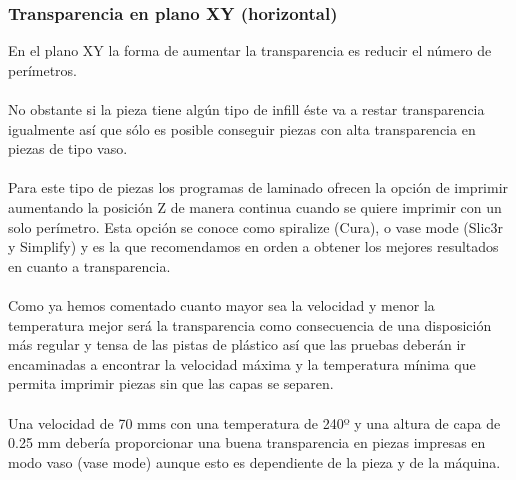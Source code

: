 \documentclass[11pt,a4paper]{article}
\begin{document}
		\subsubsection{Transparencia en plano XY (horizontal)}En el plano XY la forma de aumentar la transparencia es reducir el número de perímetros.
\\\\
No obstante si la pieza tiene algún tipo de infill éste va a restar transparencia igualmente así que sólo es posible conseguir piezas con alta transparencia en piezas de tipo vaso.
\\\\
Para este tipo de piezas los programas de laminado ofrecen la opción de imprimir aumentando la posición Z de manera continua cuando se quiere imprimir con un solo perímetro. Esta opción se conoce como spiralize (Cura), o vase mode (Slic3r y Simplify) y es la que recomendamos en orden a obtener los mejores resultados en cuanto a transparencia.
\\\\
Como ya hemos comentado cuanto mayor sea la velocidad y menor la temperatura mejor será la transparencia como consecuencia de una disposición más regular y tensa de las pistas de plástico así que las pruebas deberán ir encaminadas a encontrar la velocidad máxima y la temperatura mínima que permita imprimir piezas sin que las capas se separen.
\\\\
Una velocidad de 70 mm\/s con una temperatura de 240º y una altura de capa de 0.25 mm debería proporcionar una buena transparencia en piezas impresas en modo vaso (vase mode) aunque esto es dependiente de la pieza y de la máquina.
\end{document}
